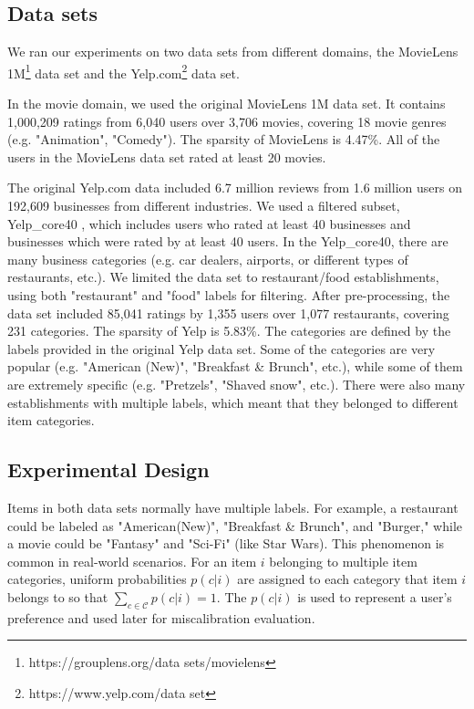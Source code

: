 \subsection{Data sets} %

We ran our experiments on two data sets from different domains, the MovieLens 1M\footnote{https://grouplens.org/data sets/movielens} data set and the Yelp.com\footnote{https://www.yelp.com/data set} data set. 


In the movie domain, we used the original MovieLens 1M data set. It contains 1,000,209 ratings from 6,040 users over 3,706 movies, covering 18 movie genres (e.g. "Animation", "Comedy"). The sparsity of MovieLens is 4.47\%. All of the users in the MovieLens data set rated at least 20 movies. 

The original Yelp.com data included 6.7 million reviews from 1.6 million users on 192,609 businesses from different industries. We used a filtered subset, Yelp\_core40 \cite{mansoury2019bias}, which includes users who rated at least 40 businesses and businesses which were rated by at least 40 users. In the Yelp\_core40, there are many business categories  (e.g. car dealers, airports, or different types of restaurants, etc.). We limited the data set to restaurant/food establishments, using both "restaurant" and "food" labels for filtering. After pre-processing, the data set included 85,041 ratings by 1,355 users over 1,077 restaurants, covering 231 categories. The sparsity of Yelp is 5.83\%. The categories are defined by the labels provided in the original Yelp data set. Some of the categories are very popular (e.g. "American (New)", "Breakfast \& Brunch", etc.), while some of them are extremely specific (e.g. "Pretzels", "Shaved snow", etc.). There were also many establishments with multiple labels, which meant that they belonged to different item categories. 

\subsection{Experimental Design}

Items in both data sets normally have multiple labels. For example, a restaurant could be labeled as "American(New)", "Breakfast \& Brunch", and "Burger," while a movie could be "Fantasy" and "Sci-Fi" (like Star Wars). This phenomenon is common in real-world scenarios. For an item $i$ belonging to multiple item categories, uniform probabilities $p(c|i)$ are assigned to each category that item $i$ belongs to so that $\sum_{c \in \mathcal{C}}p(c|i)=1$. The $p(c|i)$ is used to represent a user's preference and used later for miscalibration evaluation.

